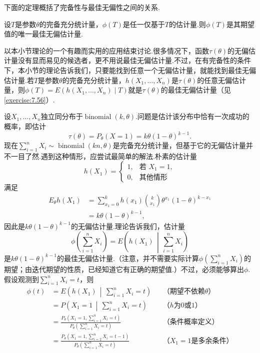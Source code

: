 下面的定理概括了完备性与最佳无偏性之间的关系.
\begin{theorem}\label{thm:7.3.23}
设$T$是参数$\theta$的完备充分统计量，$\phi(T)$是任一仅基于$T$的估计量.则$\phi(T)$是其期望值的唯一最佳无偏估计量.
\end{theorem}
以本小节理论的一个有趣而实用的应用结束讨论.很多情况下，函数$\tau(\theta)$的无偏估计量没有显而易见的候选者，更不用说最佳无偏估计量.不过，在有完备性的条件下，本小节的理论告诉我们，只要能找到任意一个无偏估计量，就能找到最佳无偏估计量.若$T$是参数$\theta$的完备充分统计量，$h(X_1,\ldots,X_n)$是$\tau(\theta)$的任意无偏估计量，则$\phi(T)=E(h(X_1,\ldots,X_n)\mid T)$就是$\tau(\theta)$的最佳无偏估计量（见\autoref{exercise:7.56}）.
\begin{example}[二项分布的最佳无偏估计]\label{ex:7.3.24}
设$X_1,\ldots,X_n$独立同分布于$\operatorname{binomial}(k,\theta)$.问题是估计该分布中恰有一次成功的概率，即估计
$$\tau(\theta)=P_\theta(X=1)=k\theta(1-\theta)^{k-1}.$$
现在$\sum_{i=1}^nX_i\sim\operatorname{binomial}(kn,\theta)$是完备充分统计量，但基于它的无偏估计量并不一目了然.遇到这种情形，应尝试最简单的解法.朴素的估计量
$$h(X_1)=\begin{cases}1,&\text{若 }X_1=1,\\0,&\text{其他情形}\end{cases}$$
满足
\begin{align*}
E_\theta h(X_1)&=\sum_{x_1=0}^kh(x_1)\binom k{x_1}\theta^{x_1}(1-\theta)^{k-x_1}\\
&=k\theta(1-\theta)^{k-1},
\end{align*}
因此是$k\theta(1-\theta)^{k-1}$的无偏估计量.理论告诉我们，估计量
$$\phi\left(\sum_{i=1}^nX_i\right)=E\left(h(X_1)\,\middle|\,\sum_{i=1}^nX_i\right)$$
是$k\theta(1-\theta)^{k-1}$的最佳无偏估计量.（注意，并不需要实际计算$\phi(\sum_{i=1}^nX_i)$的期望；由迭代期望的性质，已经知道它有正确的期望值.）不过，必须能够算出$\phi$.假设观测到$\sum_{i=1}^nX_i=t$，则
\begin{align*}
\phi(t)&=E\left(h(X_1)\,\middle|\,\sum_{i=1}^nX_i=t\right)&&\text{（期望不依赖$\theta$）}\\
&=P\left(X_1=1\,\middle|\,\sum_{i=1}^nX_i=t\right)&&\text{（$h$为0或1）}\\
&=\frac{P_\theta(X_1=1,\sum_{i=1}^nX_i=t)}{P_\theta(\sum_{i=1}^nX_i=t)}&&\text{（条件概率定义）}\\
&=\frac{P_\theta(X_1=1,\sum_{i=2}^nX_i=t-1)}{P_\theta(\sum_{i=1}^nX_i=t)}&&\text{（$X_1=1$是多余条件）}\\

\end{align*}
\end{example}
